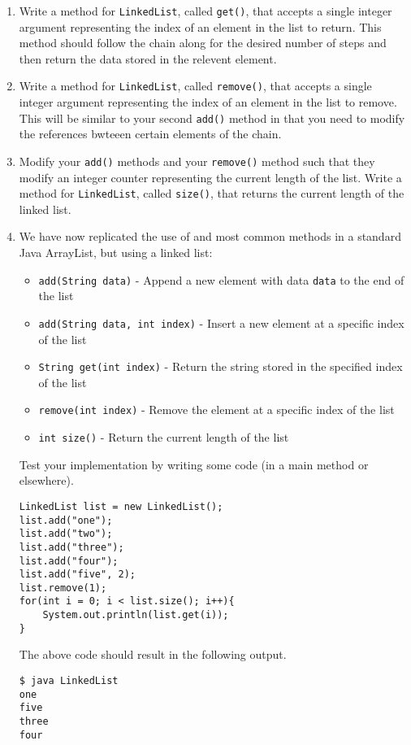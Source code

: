 \documentclass[11pt,a4paper]{report}
\begin{document}
\begin{enumerate}
    \item Write a method for \texttt{LinkedList}, called \texttt{get()}, that accepts a single integer argument representing the index of an element in the list to return. This method should follow the chain along for the desired number of steps and then return the data stored in the relevent element.

    \item Write a method for \texttt{LinkedList}, called \texttt{remove()}, that accepts a single integer argument representing the index of an element in the list to remove. This will be similar to your second \texttt{add()} method in that you need to modify the references bwteeen certain elements of the chain.

    \item Modify your \texttt{add()} methods and your \texttt{remove()} method such that they modify an integer counter representing the current length of the list. Write a method for \texttt{LinkedList}, called \texttt{size()}, that returns the current length of the linked list.

    \item We have now replicated the use of and most common methods in a standard Java ArrayList, but using a linked list:
        \begin{itemize}
            \item \texttt{add(String data)} - Append a new element with data \texttt{data} to the end of the list
            \item \texttt{add(String data, int index)} - Insert a new element at a specific index of the list
            \item \texttt{String get(int index)} - Return the string stored in the specified index of the list
            \item \texttt{remove(int index)} - Remove the element at a specific index of the list
            \item \texttt{int size()} - Return the current length of the list
        \end{itemize}
    
        Test your implementation by writing some code (in a main method or elsewhere).
\begin{verbatim}
LinkedList list = new LinkedList();
list.add("one");
list.add("two");
list.add("three");
list.add("four");
list.add("five", 2);
list.remove(1);
for(int i = 0; i < list.size(); i++){
    System.out.println(list.get(i));
}
\end{verbatim}
    The above code should result in the following output.
\begin{verbatim}
$ java LinkedList
one
five
three
four
\end{verbatim}


\end{enumerate}
\end{document}
